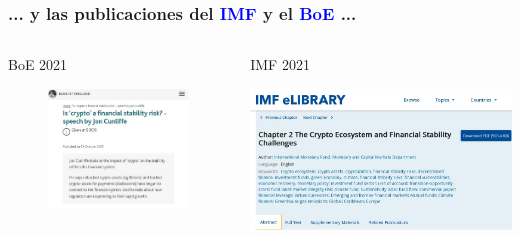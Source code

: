 \begin{frame}
\frametitle{... y las publicaciones del \textcolor{blue}{IMF} y el \textcolor{blue}{BoE} ...}

\begin{columns}
    \begin{column}{0.5\textwidth}
        \begin{block}{BoE 2021}
        \begin{figure}[H]
        \begin{center}
         \includegraphics[width=1\textwidth]{images/C1/global/BoE 2021.jpg}
         \end{center}
        \end{figure}
              \end{block}
    \end{column}
    \begin{column}{0.5\textwidth}  %
        \begin{block}{IMF 2021}
        \begin{center}
         \includegraphics[width=1\textwidth]{images/C1/global/IMF 2021d.jpg}
         \end{center}
             \end{block}
    \end{column}
\end{columns}


\end{frame}
